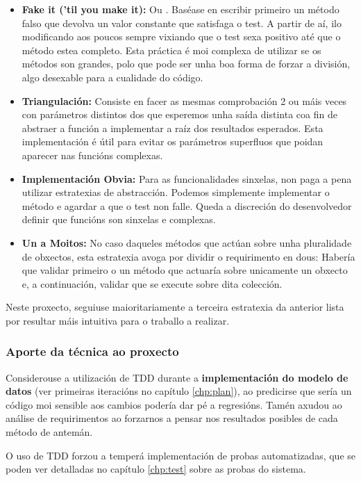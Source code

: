 \begin{itemize}
	\item \textbf{Fake it ('til you make it):} Ou . Baséase en escribir primeiro un método falso que devolva un valor constante que satisfaga o test. A partir de aí, ilo modificando aos poucos sempre vixiando que o test sexa positivo até que o método estea completo. Esta práctica é moi complexa de utilizar se os métodos son grandes, polo que pode ser unha boa forma de forzar a división, algo desexable para a cualidade do código.
	
	\item \textbf{Triangulación:} Consiste en facer as mesmas comprobación 2 ou máis veces con parámetros distintos dos que esperemos unha saída distinta coa fin de abstraer a función a implementar a raíz dos resultados esperados. Esta implementación é útil para evitar os parámetros superfluos que poidan aparecer nas funcións complexas.
	
	\item \textbf{Implementación Obvia:} Para as funcionalidades sinxelas, non paga a pena utilizar estratexias de abstracción. Podemos simplemente implementar o método e agardar a que o test non falle. Queda a discreción do desenvolvedor definir que funcións son sinxelas e complexas.
	
	\item \textbf{Un a Moitos:} No caso daqueles métodos que actúan sobre unha pluralidade de obxectos, esta estratexia avoga por dividir o requirimento en dous: Habería que validar primeiro o un método que actuaría sobre unicamente un obxecto e, a continuación, validar que se execute sobre dita colección.  

\end{itemize}


Neste proxecto, seguiuse maioritariamente a terceira estratexia da anterior lista por resultar máis intuitiva para o traballo a realizar.

\subsubsection{Aporte da técnica ao proxecto}

Considerouse a utilización de TDD durante a \textbf{implementación do modelo de datos} (ver primeiras iteracións no capítulo \ref{chp:plan}), ao predicirse que sería un código moi sensible aos cambios podería dar pé a regresións. Tamén axudou ao análise de requirimentos ao forzarnos a pensar nos resultados posibles de cada método de antemán.

O uso de TDD forzou a temperá implementación de probas automatizadas, que se poden ver detalladas no capítulo \ref{chp:test} sobre as probas do sistema.


